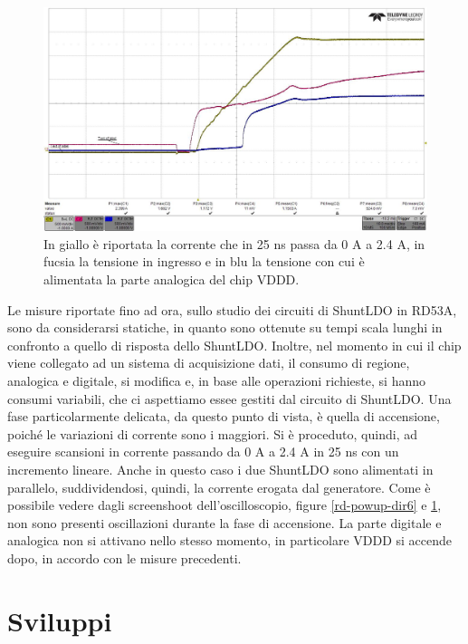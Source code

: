 \begin{figure}
\centering
\includegraphics[scale=.3]{Immagini/rd-powup-dir7}
\caption{In giallo è riportata la corrente che in 25 ns passa da 0 A a 2.4 A, in fucsia la tensione in ingresso e in blu la tensione con cui è alimentata la parte analogica del chip VDDD.}
\label{rd-powup-dir7}
\end{figure}

Le misure riportate fino ad ora, sullo studio dei circuiti di ShuntLDO in RD53A, sono da considerarsi statiche, in quanto sono ottenute su tempi scala lunghi in confronto a quello di risposta dello ShuntLDO. 
Inoltre, nel momento in cui il chip viene collegato ad un sistema di acquisizione dati, il consumo di regione, analogica e digitale, si modifica e, in base alle operazioni richieste, si hanno consumi variabili, che ci aspettiamo essee gestiti dal circuito di ShuntLDO. 
Una fase particolarmente delicata, da questo punto di vista, è quella di accensione, poiché le variazioni di corrente sono i maggiori. 
Si è proceduto, quindi, ad eseguire scansioni in corrente passando da 0 A a 2.4 A in 25 ns con un incremento lineare. 
Anche in questo caso i due ShuntLDO sono alimentati in parallelo, suddividendosi, quindi, la corrente erogata dal generatore. 
Come è possibile vedere dagli screenshoot dell'oscilloscopio, figure \ref{rd-powup-dir6} e \ref{rd-powup-dir7}, non sono presenti oscillazioni durante la fase di accensione.
La parte digitale e analogica non si attivano nello stesso momento, in particolare VDDD si accende dopo, in accordo con le misure precedenti.

\section{Sviluppi}

